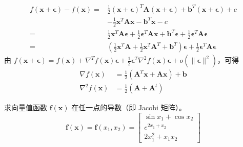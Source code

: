 \begin{solution}
    $$\begin{aligned}
        f(\boldsymbol{x}+\boldsymbol{\epsilon})-f(\boldsymbol{x}) =& \frac{1}{2}(\boldsymbol{x}+\boldsymbol{\epsilon})^T\boldsymbol{A}(\boldsymbol{x}+\boldsymbol{\epsilon})+\boldsymbol{b}^T(\boldsymbol{x}+\boldsymbol{\epsilon})+c\\
        &-\frac{1}{2}\boldsymbol{x}^T\boldsymbol{A}\boldsymbol{x}-\boldsymbol{b}^T\boldsymbol{x}-c\\
        =&\frac{1}{2}\boldsymbol{x}^T\boldsymbol{A}\boldsymbol{\epsilon}+\frac{1}{2}\boldsymbol{\epsilon}^T\boldsymbol{A}\boldsymbol{x}+\boldsymbol{b}^T\boldsymbol{\epsilon}+\frac{1}{2}\boldsymbol{\epsilon}^T\boldsymbol{A}\boldsymbol{\epsilon}\\
        =&(\frac{1}{2}\boldsymbol{x}^T\boldsymbol{A}+\frac{1}{2}\boldsymbol{x}^T\boldsymbol{A}^T+\boldsymbol{b}^T)\boldsymbol{\epsilon}+\frac{1}{2}\boldsymbol{\epsilon}^T\boldsymbol{A}\boldsymbol{\epsilon}
    \end{aligned}$$
    由 $f(\boldsymbol{x}+\boldsymbol{\epsilon})=f(\boldsymbol{x})+\nabla^Tf(\boldsymbol{x})\boldsymbol{\epsilon}+\frac{1}{2}\boldsymbol{\epsilon}^T\nabla^2f(\boldsymbol{x})\boldsymbol{\epsilon} + o(\|\boldsymbol{\epsilon}\|^2)$，可得
    $$\begin{aligned}
        \nabla f(\boldsymbol{x}) &= \frac{1}{2}(\boldsymbol{A}^T\boldsymbol{x}+\boldsymbol{A}\boldsymbol{x})+\boldsymbol{b}\\
        \nabla^2 f(\boldsymbol{x}) &= \frac{1}{2}(\boldsymbol{A} + \boldsymbol{A}^t)
    \end{aligned}$$
\end{solution}

\begin{problem}
    求向量值函数 $\boldsymbol{f}(\boldsymbol{x})$ 在任一点的导数（即 Jacobi 矩阵）。
    $$\boldsymbol{f}(\boldsymbol{x})=\boldsymbol{f}(x_1,x_2)=\begin{bmatrix}
        \sin x_1+\cos x_2\\
        e^{2x_1+x_2}\\
        2x_1^2+x_1x_2
    \end{bmatrix}$$
\end{problem}

